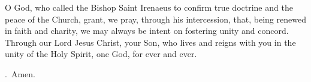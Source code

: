 \lettrine[lines=3]{O}{} God, who called the Bishop Saint Irenaeus
to confirm true doctrine and the peace of the Church,
grant, we pray, through his intercession,
that, being renewed in faith and charity,
we may always be intent on fostering unity and concord.
Through our Lord Jesus Christ, your Son,
who lives and reigns with you in the unity of the Holy Spirit,
one God, for ever and ever. \par \Rbar.~Amen.
